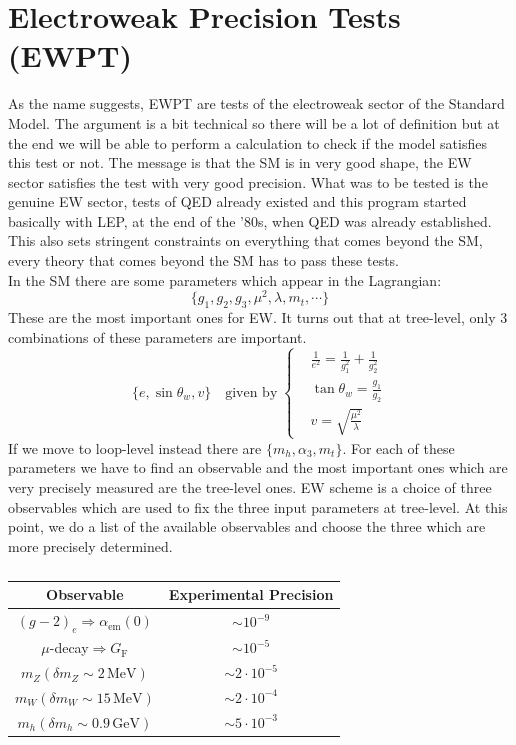 \documentclass[../main.tex]{subfiles}
\begin{document}
\section{Electroweak Precision Tests (EWPT)}
As the name suggests, EWPT are tests of the electroweak sector of the Standard Model. The argument is a bit technical so there will be a lot of definition but at the end we will be able to perform a calculation to check if the model satisfies this test or not. The message is that the SM is in very good shape, the EW sector satisfies the test with very good precision. What was to be tested is the genuine EW sector, tests of QED already existed and this program started basically with LEP, at the end of the '80s, when QED was already established. This also sets stringent constraints on everything that comes beyond the SM, every theory that comes beyond the SM has to pass these tests.\\
In the SM there are some parameters which appear in the Lagrangian:
\[
\{g_1, g_2, g_3, \mu^2, \lambda, m_t,\cdots\}
\]
These are the most important ones for EW. It turns out that at tree-level, only 3 combinations of these parameters are important.
\[
\{e,\sin\theta_w,v\} \quad \text{given by}\; \left\{
\begin{aligned}
&\frac{1}{e^2}=\frac{1}{g_1^2}+\frac{1}{g_2^2}\\
&\tan\theta_w=\frac{g_1}{g_2}\\
&v=\sqrt{\frac{\mu^2}{\lambda}}
\end{aligned}
\right.
\]
If we move to loop-level instead there are $\{m_h, \alpha_3, m_t\}$. For each of these parameters we have to find an observable and the most important ones which are very precisely measured are the tree-level ones. EW scheme is a choice of three observables which are used to fix the three input parameters at tree-level. At this point, we do a list of the available observables and choose the three which are more precisely determined.
\begin{table}[h]
    \centering
    \begin{tabular}{c|c}
    \hline
    \rowcolor{gray!45} Observable & Experimental Precision\\
    \hline
    $(g-2)_e\Rightarrow\alpha_{\text{em}}(0)$ & $\sim10^{-9}$\\
    $\mu$-decay$\Rightarrow G_{\text{F}}$ & $\sim10^{-5}$\\
    $m_Z(\delta m_Z\sim2\,\text{MeV})$ & $\sim2\cdot10^{-5}$\\
    $m_W(\delta m_W\sim15\,\text{MeV})$ & $\sim2\cdot10^{-4}$\\
    $m_h(\delta m_h\sim0.9\,\text{GeV})$ & $\sim5\cdot10^{-3}$\\
    \hline
    \end{tabular}
    \caption*{}
\end{table}\\
\end{document}

